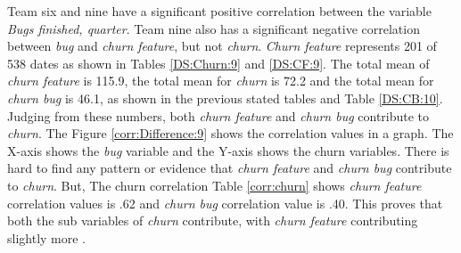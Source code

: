 \documentclass[UKenglish]{ifimaster}  %
\begin{document}
Team six and nine have a significant positive correlation between the variable \textit{Bugs finished, quarter}. Team nine also has a significant negative correlation between \textit{bug} and \textit{churn feature}, but not \textit{churn}. \textit{Churn feature} represents 201 of 538 dates as shown in Tables \ref{DS:Churn:9} and \ref{DS:CF:9}.  The total mean of \textit{churn feature} is 115.9, the total mean for \textit{churn} is 72.2 and the total mean for \textit{churn bug} is 46.1, as shown in the previous stated tables and Table \ref{DS:CB:10}. Judging from these numbers, both \textit{churn feature} and \textit{churn bug} contribute to \textit{churn}. The Figure \ref{corr:Difference:9} shows the correlation values in a graph. The X-axis shows the \textit{bug} variable and the Y-axis shows the churn variables. There is hard to find any pattern or evidence that \textit{churn feature} and \textit{churn bug} contribute to \textit{churn}. But, The churn correlation Table \ref{corr:churn} shows \textit{churn feature} correlation values is .62 and \textit{churn bug} correlation value is .40. This proves that both the sub variables of \textit{churn} contribute, with \textit{churn feature} contributing slightly more . 
\end{document}
